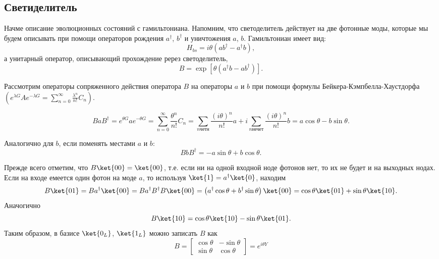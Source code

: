 \subsection{Светиделитель}

Начме описание эволюционных состояний с гамильтониана. Напомним, что
светоделитель действует на две фотонные моды, которые мы будем описывать при
помощи операторов рождения $a^\dag$, $b^\dag$ и уничтожения $a$, $b$.
Гамильтониан имеет вид:
\begin{equation}
  H_{bs} = i \theta\left(ab^\dag - a^\dag b\right),
\end{equation}
а унитарный оператор, описывающий прохождение ререз светоделитель,
\begin{equation}
  B=\exp\left[\theta\left(a^\dag b - ab^\dag\right)\right].
\end{equation}

Рассмотрим операторы сопряженного действия оператора $B$ на операторы $a$ и
$b$ при помощи формулы Бейкера-Кэмпбелла-Хаустдорфа
$\left( e^{\lambda G}Ae^{-\lambda G} =
\sum_{n=0}^{\infty}\frac{\lambda^n}{n!}C_n \right)$.

\begin{equation}
  BaB^\dag = e^{\theta G}ae^{-\theta G}
  = \sum_{n=0}^{\infty} \frac{\theta^n}{n!} C_n
  = \sum_{n \text{четн}} \frac{{(i\theta)}^n}{n!} a
  + i \sum_{n \text{нечет}} \frac{{(i\theta)}^n}{n!} b
  = a \cos \theta - b \sin \theta.
\end{equation}

Аналогично для $b$, если поменять местами $a$ и $b$:
\begin{equation}
  BbB^\dag = -a\sin\theta + b\cos\theta.
\end{equation}

Прежде всего отметим, что $B \ket{00} = \ket{00}$, т.е. если ни на одной
входной ноде фотонов нет, то их не будет и на выходных нодах. Если на входе
емеется один фотон на моде $a$, то используя $\ket{1} = a^\dag\ket{0}$, находим
\begin{equation}
  B\ket{01} = Ba^\dag\ket{00} = Ba^\dag B^\dag B\ket{00}
  = \left( a^\dag \cos\theta + b^\dag \sin\theta \right) \ket{00}
  = \cos \theta\ket{01} + \sin \theta\ket{10}.
\end{equation}
Аначогично
\begin{equation}
  B\ket{10} = \cos\theta\ket{10} - \sin\theta\ket{01}.
\end{equation}
Таким образом, в базисе $\ket{0_L}$, $\ket{1_L}$ можно записать $B$ как
\begin{equation}
  B = \begin{bmatrix}
    \cos\theta & -\sin\theta \\
    \sin\theta & \cos\theta
  \end{bmatrix} = e^{i\theta Y}
\end{equation}

